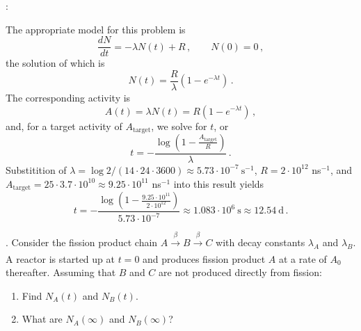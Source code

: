\vspace{0.5cm}
\ifsolved
{
\color{purple}

:

The appropriate model for this problem is
\begin{equation*}
 \frac{dN}{dt} = -\lambda N(t) + R \, , \qquad N(0) = 0 \, ,
\end{equation*}
the solution of which is
\begin{equation*}
 N(t) = \frac{R}{\lambda} (1 - e^{-\lambda t}) \, .
\end{equation*}
The corresponding activity is
\begin{equation*}
 A(t) = \lambda N(t) = R(1-e^{-\lambda t}) \, ,
\end{equation*}
and, for a target activity of $A_{\text{target}}$, we solve for $t$, or
\begin{equation*}
  t =  -\frac{\log{\left( 1-\frac{A_{\text{target}}}{R} \right ) }}{\lambda} \, .
\end{equation*}
Substitition of $\lambda = \log{2}/(14\cdot 24\cdot 3600)\approx 5.73\cdot 10^{-7}~\text{s}^{-1}$, $R=2\cdot 10^{12}$ ns$^{-1}$, and
$A_{\text{target}} = 25\cdot 3.7\cdot 10^{10} \approx 9.25\cdot 10^{11}$ ns$^{-1}$ into this result yields
\begin{equation*}
  t = -\frac{ \log{ \left( 1-\frac{9.25\cdot 10^{11}}{2\cdot 10^{12}} \right ) }}
  {5.73\cdot 10^{-7}} \approx \boxed{1.083\cdot 10^{6}~\text{s} \approx 12.54~\text{d}} \, .
\end{equation*}




} %
\newpage
\else
\fi


.
Consider the fission product chain $A \xrightarrow[]{\,\, \beta \,\,} B \xrightarrow[]{\,\, \beta \,\,}  C$ with decay
constants $\lambda_A$ and $\lambda_B$. A reactor is started up at $t = 0$ and produces fission product $A$ at a rate of $A_0$ thereafter. Assuming
that $B$ and $C$ are not produced directly from fission:
\begin{enumerate}[label=(\alph*)]
\item Find $N_A(t)$ and $N_B(t)$.
\item What are $N_A(\infty)$ and $N_B(\infty)$?
\end{enumerate}


